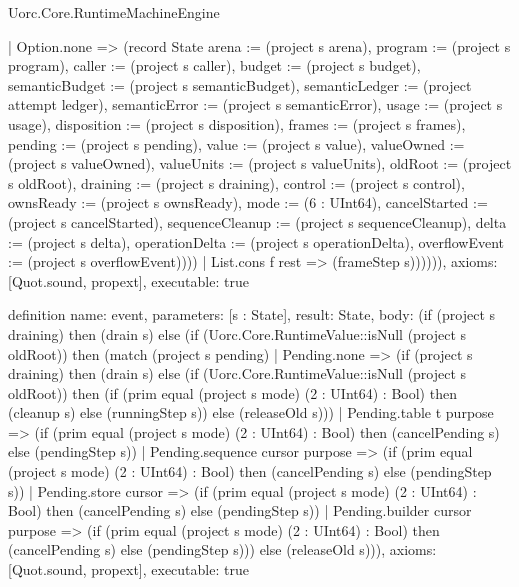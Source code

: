 \begin{lexlean}{Uorc.Core.RuntimeMachineEngine}
\begin{semanticmodule}
{      | Option.none => (record State {arena := (project s arena), program := (project s program), caller := (project s caller), budget := (project s budget), semanticBudget := (project s semanticBudget), semanticLedger := (project attempt ledger), semanticError := (project s semanticError), usage := (project s usage), disposition := (project s disposition), frames := (project s frames), pending := (project s pending), value := (project s value), valueOwned := (project s valueOwned), valueUnits := (project s valueUnits), oldRoot := (project s oldRoot), draining := (project s draining), control := (project s control), ownsReady := (project s ownsReady), mode := (6 : UInt64), cancelStarted := (project s cancelStarted), sequenceCleanup := (project s sequenceCleanup), delta := (project s delta), operationDelta := (project s operationDelta), overflowEvent := (project s overflowEvent)})))
    | List.cons f rest => (frameStep s)))))),
  axioms: [Quot.sound, propext],
  executable: true
}

definition{
  name: event,
  parameters: [s : State],
  result: State,
  body: (if (project s draining) then (drain s) else (if (Uorc.Core.RuntimeValue::isNull (project s oldRoot)) then (match (project s pending)
    | Pending.none => (if (project s draining) then (drain s) else (if (Uorc.Core.RuntimeValue::isNull (project s oldRoot)) then (if (prim equal (project s mode) (2 : UInt64) : Bool) then (cleanup s) else (runningStep s)) else (releaseOld s)))
    | Pending.table t purpose => (if (prim equal (project s mode) (2 : UInt64) : Bool) then (cancelPending s) else (pendingStep s))
    | Pending.sequence cursor purpose => (if (prim equal (project s mode) (2 : UInt64) : Bool) then (cancelPending s) else (pendingStep s))
    | Pending.store cursor => (if (prim equal (project s mode) (2 : UInt64) : Bool) then (cancelPending s) else (pendingStep s))
    | Pending.builder cursor purpose => (if (prim equal (project s mode) (2 : UInt64) : Bool) then (cancelPending s) else (pendingStep s))) else (releaseOld s))),
  axioms: [Quot.sound, propext],
  executable: true
}


\end{semanticmodule}
\end{lexlean}
